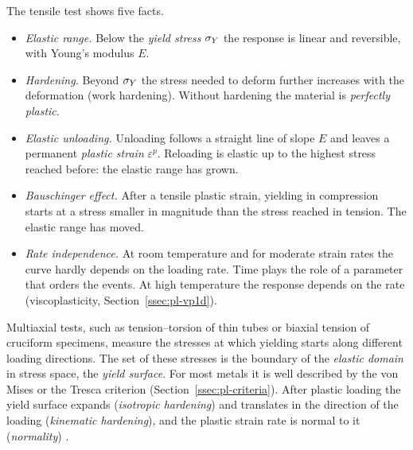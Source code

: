 The tensile test shows five facts.
\begin{itemize}
  \item \emph{Elastic range.} Below the \emph{yield stress} $\sigma_{Y}$ the response
  is linear and reversible, with Young's modulus $E$.
  \item \emph{Hardening.} Beyond $\sigma_{Y}$ the stress needed to deform further
  increases with the deformation (work hardening). Without hardening the
  material is \emph{perfectly plastic}.
  \item \emph{Elastic unloading.} Unloading follows a straight line of slope
  $E$ and leaves a permanent \emph{plastic strain} $\varepsilon^p$. Reloading
  is elastic up to the highest stress reached before: the elastic range has
  grown.
  \item \emph{Bauschinger effect.} After a tensile plastic strain, yielding in
  compression starts at a stress smaller in magnitude than the stress reached
  in tension. The elastic range has moved.
  \item \emph{Rate independence.} At room temperature and for moderate strain
  rates the curve hardly depends on the loading rate. Time plays the role of a
  parameter that orders the events. At high temperature the response depends
  on the rate (viscoplasticity, Section~\ref{ssec:pl-vp1d}).
\end{itemize}

Multiaxial tests, such as tension--torsion of thin tubes or biaxial
tension of cruciform specimens, measure the stresses at which yielding starts
along different loading directions. The set of these stresses is the boundary
of the \emph{elastic domain} in stress space, the \emph{yield surface}. For
most metals it is well described by the von Mises or the Tresca criterion
(Section~\ref{ssec:pl-criteria}). After plastic loading the yield surface
expands (\emph{isotropic hardening}) and translates in the direction of the
loading (\emph{kinematic hardening}), and the plastic strain rate is normal to
it (\emph{normality}) \cite{Lubliner1990,Salencon2002}.

